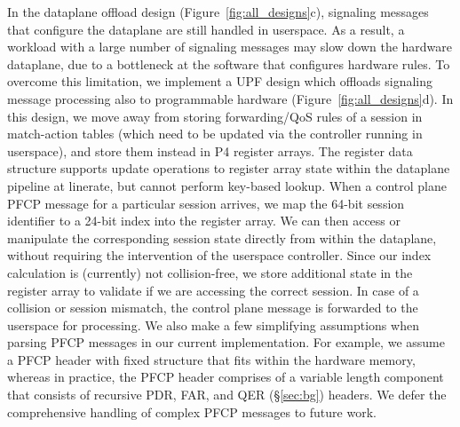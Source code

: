 In the dataplane offload design (Figure~\ref{fig:all_designs}c), signaling messages that configure the dataplane are still handled in userspace. As a result, a workload with a large number of signaling messages may slow down the hardware dataplane, due to a bottleneck at the software that configures hardware rules. To overcome this limitation, we implement a UPF design which offloads signaling message processing also to programmable hardware (Figure~\ref{fig:all_designs}d). %
In this design, we move away from storing forwarding/QoS rules of a session in match-action tables (which need to be updated via the controller running in userspace), and store them instead in P4 register arrays. The register data structure supports update operations to register array state within the dataplane pipeline at linerate, but cannot perform key-based lookup. When a control plane PFCP message for a particular session arrives, we map the 64-bit session identifier to a 24-bit index into the register array. We can then access or manipulate the corresponding session state directly from within the dataplane, without requiring the intervention of the userspace controller. Since our index calculation is (currently) not collision-free, we store additional state in the register array to validate if we are accessing the correct session. In case of a collision or session mismatch, the control plane message is forwarded to the userspace for processing. We also make a few simplifying assumptions when parsing PFCP messages in our current implementation. For example, we assume a PFCP header with fixed structure that fits within the hardware memory, whereas in practice, the PFCP header comprises of a variable length component that consists of recursive PDR, FAR, and QER (\S\ref{sec:bg}) headers.  We defer the comprehensive handling of complex PFCP messages to future work.


